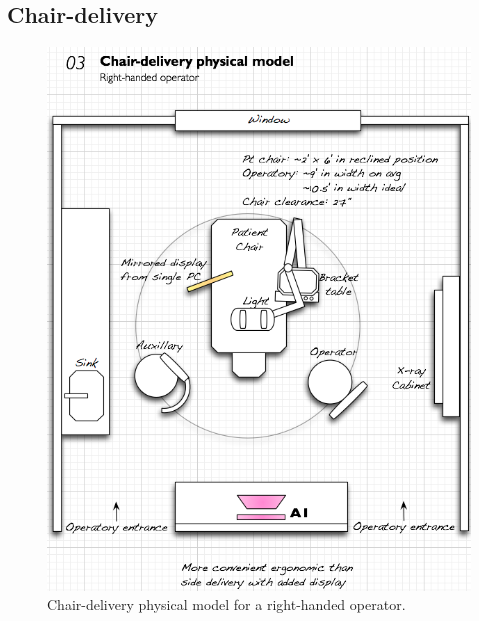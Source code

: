 \documentclass[11pt]{article}
\begin{document}
\subsection{Chair-delivery}
\begin{figure}[h!]
\begin{center}
\includegraphics[width=\textwidth]{phymodel3.png}
\end{center}
\caption{Chair-delivery physical model for a right-handed operator.}
\end{figure}
\end{document}
